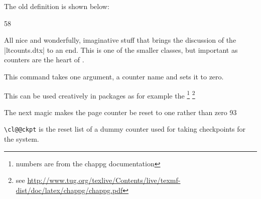 \begin{teXX}

\def\@fnsymbol#1{%
   \ifcase#1\or \TextOrMath\textasteriskcentered *\or
   \TextOrMath \textdagger \dagger\or
   \TextOrMath \textdaggerdbl \ddagger \or
   \TextOrMath \textsection  \mathsection\or
   \TextOrMath \textparagraph \mathparagraph\or
   \TextOrMath \textbardbl \|\or
   \TextOrMath {\textasteriskcentered\textasteriskcentered}{**}\or
   \TextOrMath {\textdagger\textdagger}{\dagger\dagger}\or
   \TextOrMath {\textdaggerdbl\textdaggerdbl}{\ddagger\ddagger}\else
   \@ctrerr \fi
}

\end{teXX}

The old definition is shown below:

\begin{teXX}
58 \def\@fnsymbol#1{\ensuremath{\ifcase#1\or *\or \dagger\or \ddagger\or
59 \mathsection\or \mathparagraph\or \|\or **\or \dagger\dagger
60 \or \ddagger\ddagger \else\@ctrerr\fi}}
\end{teXX}

All nice and wonderfully, imaginative stuff that brings the discussion of the |ltcounts.dtx| to an end. This is one of the smaller classes, but important as counters are the heart of \latex. 




This command takes one argument, a counter name and sets it to zero.

\begin{teXXX}
 \def\@stpelt#1{\global\csname c@#1\endcsname \z@}
\end{teXXX}


This can be used creatively in packages as for example the \footnote{numbers are from the chappg documentation} \footnote{see \url{http://www.tug.org/texlive/Contents/live/texmf-dist/doc/latex/chappg/chappg.pdf}}

\begin{teXXX}
The next magic makes the page counter be reset to one rather than zero
93 \renewcommand\@stpelt[1]{%
94 \global\csname c@#1\endcsname
95 \expandafter\ifx \csname c@#1\endcsname \c@page
96 \@ne
97 \else
98 \z@
99 \fi
100 }
\end{teXXX}



\texttt{\textbackslash cl@@ckpt}
 is the  reset list of a dummy counter 
used for taking checkpoints for the  system.


